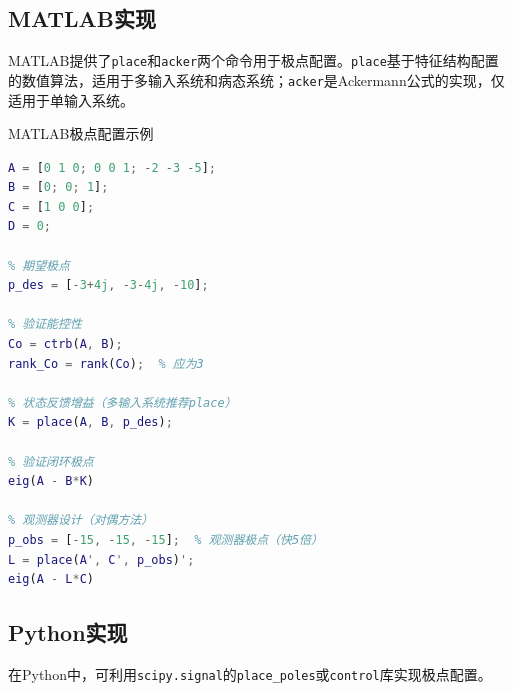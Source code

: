 \subsection{MATLAB实现}

MATLAB提供了\texttt{place}和\texttt{acker}两个命令用于极点配置。\texttt{place}基于特征结构配置的数值算法，适用于多输入系统和病态系统；\texttt{acker}是Ackermann公式的实现，仅适用于单输入系统。

\begin{mycode}{MATLAB极点配置示例}
\begin{lstlisting}[language=Matlab]
% 系统定义
A = [0 1 0; 0 0 1; -2 -3 -5];
B = [0; 0; 1];
C = [1 0 0];
D = 0;

% 期望极点
p_des = [-3+4j, -3-4j, -10];

% 验证能控性
Co = ctrb(A, B);
rank_Co = rank(Co);  % 应为3

% 状态反馈增益（多输入系统推荐place）
K = place(A, B, p_des);

% 验证闭环极点
eig(A - B*K)

% 观测器设计（对偶方法）
p_obs = [-15, -15, -15];  % 观测器极点（快5倍）
L = place(A', C', p_obs)';
eig(A - L*C)
\end{lstlisting}
\end{mycode}

\subsection{Python实现}

在Python中，可利用\texttt{scipy.signal}的\texttt{place\_poles}或\texttt{control}库实现极点配置。

